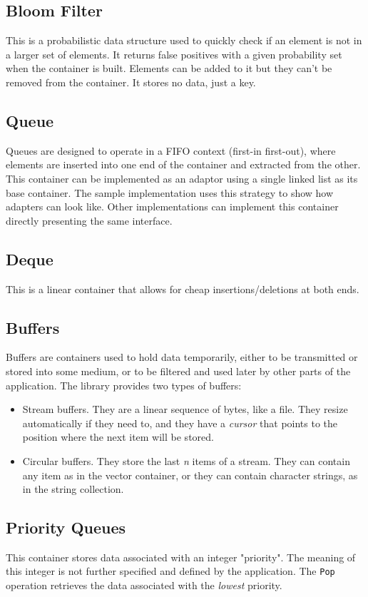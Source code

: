 \documentclass[12pt,a4paper,openany]{memoir} %
\begin{document}
\subsection{Bloom Filter}
This is a probabilistic data structure used to quickly check if an element is not in a larger set of elements. It returns false positives with a given probability set when the container is built. Elements can be added to it but they can't be removed from the container. It stores no data, just a key.
\subsection{Queue}
Queues are designed to operate in a FIFO context (first-in first-out), where elements are inserted into one end of the container and extracted from the 
other. This container can be implemented as an adaptor using a single linked list as its base container. The sample implementation uses this strategy 
to show how adapters can look like. Other implementations can implement this container directly presenting the same interface.
\subsection{Deque}
This is a linear container that allows for cheap insertions/deletions at both ends.
\subsection{Buffers}
Buffers are containers used to hold data temporarily, either to be transmitted or stored into some medium, or to be filtered and used later
by other parts of the application. The library provides two types of buffers:
\begin{itemize}
\item Stream buffers. They are a linear sequence of bytes, like a file. They resize automatically if they need to, and they have a \textsl{cursor}
that points to the position where the next item will be stored.
\item Circular buffers. They store the last \textsl{n} items of a stream. They can contain any item as in the vector container, or they can contain 
character strings, as in the string collection.
\end{itemize}
\subsection{Priority Queues}
This container stores data associated with an integer "priority". The meaning of this integer is not further specified and defined by the application.
The \verb,Pop, operation retrieves the data associated with the \textsl{lowest} priority. 
\end{document}
